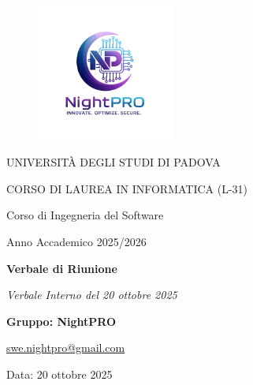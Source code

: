 \documentclass[a4paper, 11pt, oneside]{scrartcl} %
\begin{document}
\thispagestyle{empty}
\begin{titlepage}
    \centering
    
\begin{figure}
    \centering
    \includegraphics[width=0.4\textwidth]{logo.jpg}
\end{figure}

    \vfill
    
    {\small UNIVERSITÀ DEGLI STUDI DI PADOVA \par}
    {\small CORSO DI LAUREA IN INFORMATICA (L-31) \par}
    \vspace{0.5cm}
    {\large Corso di Ingegneria del Software \par}
    {\small Anno Accademico 2025/2026 \par}


    
    \vfill
    
    {\Huge \bfseries Verbale di Riunione \par}
    
    \vspace{1cm}
    
    {\Large \itshape Verbale Interno del 20 ottobre 2025 \par} 
    
    \vfill
    
    {\Large \bfseries Gruppo: NightPRO \par}
    \vspace{0.5cm}
    {\large \href{mailto:swe.nightpro@gmail.com}{swe.nightpro@gmail.com} \par}
    
    \vfill
    
    {\large Data: 20 ottobre 2025 \par}

\end{titlepage}
\end{document}
